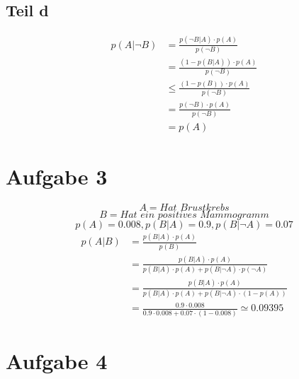 \documentclass[10pt,a4paper]{article}
\begin{document}
\subsection{Teil d}

\begin{align*}
  p(A | \lnot B) & = \frac{p(\lnot B | A) \cdot p(A)}{p(\lnot B)}\\
  & = \frac{(1 - p(B | A)) \cdot p(A)}{p(\lnot B)}\\
  & \le \frac{(1 - p(B)) \cdot p(A)}{p(\lnot B)}\\
  & = \frac{p(\lnot B) \cdot p(A)}{p(\lnot B)}\\
  & = p(A)
\end{align*}

\section{Aufgabe 3}

\begin{equation}
  A = \textit{Hat Brustkrebs}
\end{equation}
\begin{equation}
  B = \textit{Hat ein positives Mammogramm}
\end{equation}
\begin{equation}
  p(A) = 0.008, p(B | A) = 0.9, p(B | \lnot A) = 0.07
\end{equation}
\begin{align*}
  p(A | B) & = \frac{p(B | A) \cdot p(A)}{p(B)}\\
  & = \frac{p(B | A) \cdot p(A)}{p(B | A) \cdot p(A) + p(B | \lnot A) \cdot p(\lnot A)}\\
  & = \frac{p(B | A) \cdot p(A)}{p(B | A) \cdot p(A) + p(B | \lnot A) \cdot (1 - p(A))}\\
  & = \frac{0.9 \cdot 0.008}{0.9 \cdot 0.008 + 0.07 \cdot (1 - 0.008)} \simeq 0.09395
\end{align*}

\section{Aufgabe 4}
\end{document}
